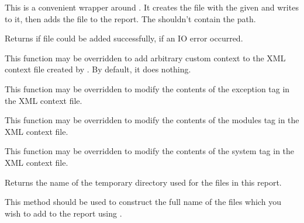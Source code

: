 This is a convenient wrapper around . It
creates the file with the given  and writes  to it, then
adds the file to the report. The  shouldn't contain the path.

Returns \true if file could be added successfully, \false if an IO error
occurred.


\label{wxdebugreportdoaddcustomcontext}


This function may be overridden to add arbitrary custom context to the XML
context file created by . By
default, it does nothing.


\label{wxdebugreportdoaddexceptioninfo}


This function may be overridden to modify the contents of the exception tag in
the XML context file.


\label{wxdebugreportdoaddloadedmodules}


This function may be overridden to modify the contents of the modules tag in
the XML context file.


\label{wxdebugreportdoaddsysteminfo}


This function may be overridden to modify the contents of the system tag in
the XML context file.


\label{wxdebugreportgetdirectory}


Returns the name of the temporary directory used for the files in this report.

This method should be used to construct the full name of the files which you
wish to add to the report using .


\label{wxdebugreportgetfile}

